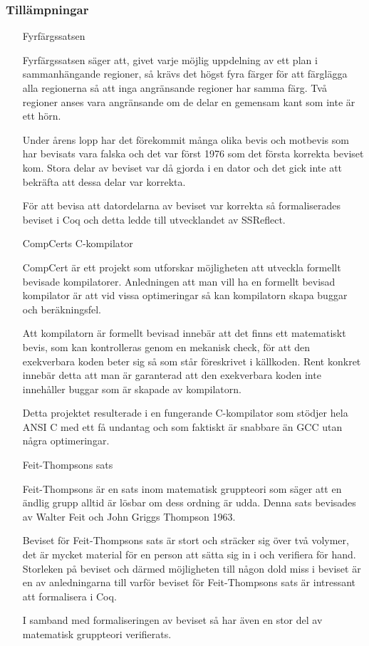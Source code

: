 \subsubsection{Tillämpningar}
\begin{itemize}

\item[Fyrfärgssatsen]

Fyrfärgssatsen\autocite{gonthier2008formal} säger att, givet varje möjlig
uppdelning av ett plan i sammanhängande regioner, så krävs det högst fyra
färger för att färglägga alla regionerna så att inga angränsande regioner
har samma färg. Två regioner anses vara angränsande om de delar en
gemensam kant som inte är ett hörn.


Under årens lopp har det förekommit många olika bevis och motbevis som har
bevisats vara falska och  det var först 1976 som det första korrekta
beviset kom. Stora delar av beviset var då gjorda i en dator och det
gick inte att bekräfta att dessa delar var korrekta.

För att bevisa att datordelarna av beviset var korrekta så formaliserades
beviset i Coq och detta ledde till utvecklandet av SSReflect.

\item[CompCerts C-kompilator]

CompCert\autocite{compcert} är ett projekt som utforskar möjligheten att
utveckla formellt bevisade kompilatorer. Anledningen att man vill ha en formellt
bevisad kompilator är att vid vissa optimeringar så kan kompilatorn skapa
buggar och beräkningsfel.

Att kompilatorn är formellt bevisad innebär att det finns ett matematiskt bevis,
som kan kontrolleras genom en mekanisk check, för att den exekverbara koden
beter sig så som står föreskrivet i källkoden. Rent konkret innebär detta att
man är garanterad att den exekverbara koden inte innehåller buggar
som är skapade av kompilatorn.

Detta projektet resulterade i en fungerande C-kompilator som stödjer
hela ANSI C med ett få undantag och som faktiskt är snabbare än
GCC utan några optimeringar.

\item[Feit-Thompsons sats]

Feit-Thompsons är en sats inom matematisk gruppteori som säger att en ändlig
grupp alltid är lösbar om dess ordning är udda\cite{aschbacher2004status}.
Denna sats bevisades av Walter Feit och John Griggs Thompson 1963.

Beviset för Feit-Thompsons sats är stort och sträcker sig över två volymer,
det är mycket material för en person att sätta sig in i och verifiera för hand.
Storleken på beviset och därmed möjligheten till någon dold miss i beviset är
en av anledningarna till varför beviset för Feit-Thompsons sats är intressant
att formalisera i Coq.

I samband med formaliseringen av beviset så har även en stor del av
matematisk gruppteori verifierats.
\end{itemize}


